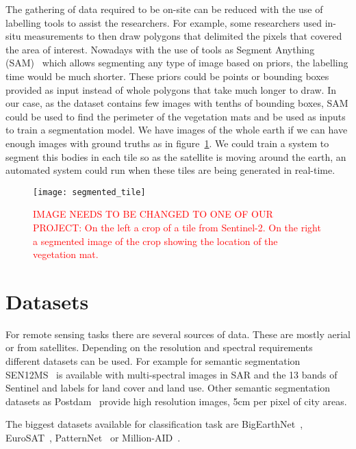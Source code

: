\documentclass[conference]{IEEEtran}
\begin{document}
    The gathering of data required to be on-site can be reduced with the use of labelling tools to assist the researchers.
    For example, some researchers used in-situ measurements to then draw polygons that delimited the pixels that covered the area of interest.
    Nowadays with the use of tools as Segment Anything (SAM)~\cite{kirillov2023segment} which allows segmenting any type of image based on priors, the labelling time would be much shorter.
    These priors could be points or bounding boxes provided as input instead of whole polygons that take much longer to draw.
    In our case, as the dataset contains few images with tenths of bounding boxes, SAM could be used to find the perimeter
    of the vegetation mats and be used as inputs to train a segmentation model.
    We have images of the whole earth if we can have enough images with ground truths as in figure~\ref{fig:tile-segmented}.
    We could train a system to segment this bodies in each tile so as the satellite is moving around the earth, an automated system could run when these tiles are being generated in real-time.

    \begin{figure}[h]
        \centering
        \texttt{[image: segmented\_tile]}
        \caption{\textcolor{red}{IMAGE NEEDS TO BE CHANGED TO ONE OF OUR PROJECT:
        On the left a crop of a tile from Sentinel-2. On the right a segmented image of the crop showing the
        location of the vegetation mat.}}
        \label{fig:tile-segmented}
    \end{figure}


    \section{Datasets}\label{sec:dataset}
    For remote sensing tasks there are several sources of data.
    These are mostly aerial or from satellites.
    Depending on the resolution and spectral requirements different datasets can be used.
    For example for semantic segmentation SEN12MS~\cite{SEN12MS_dataset} is available with multi-spectral images
    in SAR and the 13 bands of Sentinel and labels for land cover and land use.
    Other semantic segmentation datasets as Postdam~\cite{postdam_dataset} provide high resolution images, 5cm per pixel of
    city areas.

    The biggest datasets available for classification task are BigEarthNet~\cite{bigearthnet}, EuroSAT~\cite{helber2019eurosat},
    PatternNet~\cite{patternet} or Million-AID~\cite{millionaid}.
\end{document}
